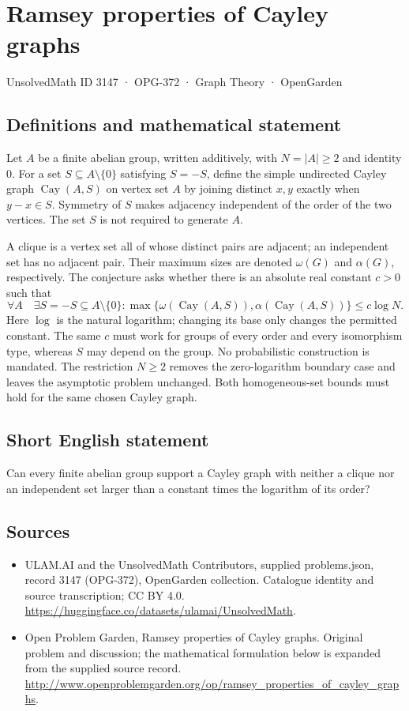 \documentclass[11pt,a4paper]{article}
\begin{document}
\section*{Ramsey properties of Cayley graphs}\label{3147}
{\small UnsolvedMath ID 3147 · OPG-372 · Graph Theory · OpenGarden}
\subsection{Definitions and mathematical statement}
Let $A$ be a finite abelian group, written additively, with
$N=|A|\geq2$ and identity $0$. For a set
$S\subseteq A\setminus\{0\}$ satisfying $S=-S$, define the simple
undirected Cayley graph $\operatorname{Cay}(A,S)$ on vertex set $A$
by joining distinct $x,y$ exactly when $y-x\in S$. Symmetry of $S$
makes adjacency independent of the order of the two vertices.
The set $S$ is not required to generate $A$.

A clique is a vertex set all of whose distinct pairs are adjacent;
an independent set has no adjacent pair. Their maximum sizes are
denoted $\omega(G)$ and $\alpha(G)$, respectively. The conjecture
asks whether there is an absolute real constant $c>0$ such that
\[
 \forall A\quad\exists S=-S\subseteq A\setminus\{0\}:
 \max\{\omega(\operatorname{Cay}(A,S)),
        \alpha(\operatorname{Cay}(A,S))\}\leq c\log N.
\]
Here $\log$ is the natural logarithm; changing its base only changes
the permitted constant. The same $c$ must work for groups of every
order and every isomorphism type, whereas $S$ may depend on the
group. No probabilistic construction is mandated. The restriction
$N\geq2$ removes the zero-logarithm boundary case and leaves the
asymptotic problem unchanged. Both homogeneous-set bounds must hold
for the same chosen Cayley graph.
\subsection{Short English statement}
Can every finite abelian group support a Cayley graph with neither a clique nor an independent set larger than a constant times the logarithm of its order?
\subsection{Sources}
\begin{itemize}
\item[S1] ULAM.AI and the UnsolvedMath Contributors, supplied problems.json, record 3147 (OPG-372), OpenGarden collection. Catalogue identity and source transcription; CC BY 4.0.
\url{https://huggingface.co/datasets/ulamai/UnsolvedMath}.
\item[S2] Open Problem Garden, Ramsey properties of Cayley graphs. Original problem and discussion; the mathematical formulation below is expanded from the supplied source record.
\url{http://www.openproblemgarden.org/op/ramsey_properties_of_cayley_graphs}.
\end{itemize}
\end{document}

